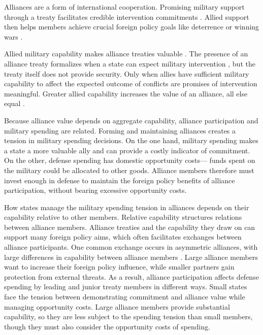\documentclass[12pt]{article}
\begin{document}
Alliances are a form of international cooperation. 
Promising military support through a treaty facilitates credible intervention commitments \citep{Fearon1997, Morrow2000}. 
Allied support then helps members achieve crucial foreign policy goals like deterrence or winning wars \citep{Walt1990, Snyder1997}. 


Allied military capability makes alliance treaties valuable \citep{FordhamPoast2014}. 
The presence of an alliance treaty formalizes when a state can expect military intervention \citep{Morrow2000}, but the treaty itself does not provide security. 
Only when allies have sufficient military capability to affect the expected outcome of conflicts are promises of intervention meaningful.  
Greater allied capability increases the value of an alliance, all else equal \citep{Johnsonetal2015}.


Because alliance value depends on aggregate capability, alliance participation and military spending are related. 
Forming and maintaining alliances creates a tension in military spending decisions. 
On the one hand, military spending makes a state a more valuable ally and can provide a costly indicator of commitment. 
On the other, defense spending has domestic opportunity costs--- funds spent on the military could be allocated to other goods. 
Alliance members therefore must invest enough in defense to maintain the foreign policy benefits of alliance participation, without bearing excessive opportunity costs. 


How states manage the military spending tension in alliances depends on their capability relative to other members. 
Relative capability structures relations between alliance members. 
Alliance treaties and the capability they draw on can support many foreign policy aims, which often facilitates exchanges between alliance participants. 
One common exchange occurs in asymmetric alliances, with large differences in capability between alliance members \citep{Morrow1991}. 
Large alliance members want to increase their foreign policy influence, while smaller partners gain protection from external threats. 
As a result, alliance participation affects defense spending by leading and junior treaty members in different ways. 
Small states face the tension between demonstrating commitment and alliance value while managing opportunity costs. 
Large alliance members provide substantial capability, so they are less subject to the spending tension than small members, though they must also consider the opportunity costs of spending. 
\end{document}
